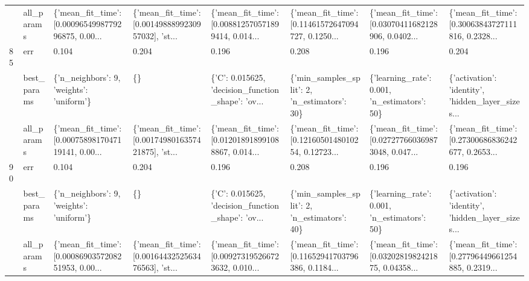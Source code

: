 \begin{tabular}{llllllll}
    & all\_params &  \{'mean\_fit\_time': [0.0009654998779296875, 0.00... &  \{'mean\_fit\_time': [0.0014988899230957032], 'st... &  \{'mean\_fit\_time': [0.008812570571899414, 0.014... &  \{'mean\_fit\_time': [0.11461572647094727, 0.1250... &  \{'mean\_fit\_time': [0.03070411682128906, 0.0402... &  \{'mean\_fit\_time': [0.30063843727111816, 0.2328... \\
85  & err &                                              0.104 &                                              0.204 &                                              0.196 &                                              0.208 &                                              0.196 &                                              0.204 \\
    & best\_params &           \{'n\_neighbors': 9, 'weights': 'uniform'\} &                                                 \{\} &  \{'C': 0.015625, 'decision\_function\_shape': 'ov... &       \{'min\_samples\_split': 2, 'n\_estimators': 30\} &       \{'learning\_rate': 0.001, 'n\_estimators': 50\} &  \{'activation': 'identity', 'hidden\_layer\_sizes... \\
    & all\_params &  \{'mean\_fit\_time': [0.0007589817047119141, 0.00... &  \{'mean\_fit\_time': [0.0017498016357421875], 'st... &  \{'mean\_fit\_time': [0.012018918991088867, 0.014... &  \{'mean\_fit\_time': [0.1216050148010254, 0.12723... &  \{'mean\_fit\_time': [0.027277660369873048, 0.047... &  \{'mean\_fit\_time': [0.27300686836242677, 0.2653... \\
90  & err &                                              0.104 &                                              0.204 &                                              0.196 &                                              0.208 &                                              0.196 &                                              0.196 \\
    & best\_params &           \{'n\_neighbors': 9, 'weights': 'uniform'\} &                                                 \{\} &  \{'C': 0.015625, 'decision\_function\_shape': 'ov... &       \{'min\_samples\_split': 2, 'n\_estimators': 40\} &       \{'learning\_rate': 0.001, 'n\_estimators': 50\} &  \{'activation': 'identity', 'hidden\_layer\_sizes... \\
    & all\_params &  \{'mean\_fit\_time': [0.0008690357208251953, 0.00... &  \{'mean\_fit\_time': [0.0016443252563476563], 'st... &  \{'mean\_fit\_time': [0.009273195266723632, 0.010... &  \{'mean\_fit\_time': [0.11652941703796386, 0.1184... &  \{'mean\_fit\_time': [0.0320281982421875, 0.04358... &  \{'mean\_fit\_time': [0.27796449661254885, 0.2319... \\

\end{tabular}
